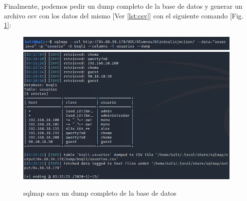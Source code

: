 \documentclass[a4paper,oneside]{article}
\begin{document}
Finalmente, podemos pedir un dump completo de la base de datos y generar un archivo csv con los datos del mismo [Ver \ref{lst:csv}] con el siguiente comando [Fig. \ref{fig:sqlmap5}]:

\pagebreak


\begin{figure}[h!]
  \centering
  \includegraphics[scale=0.6]{images/sqlmap5.png}\\
  \vspace{.5cm}
  \includegraphics[scale=0.6]{images/sqlmap6.png}
  \caption{sqlmap saca un dump completo de la base de datos}
  \label{fig:sqlmap5}
\end{figure}

\newpage
\end{document}
